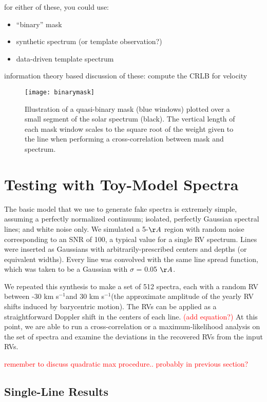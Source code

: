 \documentclass[modern]{aastex61}
\newcommand{\kms}{km s$^{-1}$}
\newcommand\todo[1]{\textcolor{red}{#1}}  %
\begin{document}
for either of these, you could use:
\begin{itemize}
\item ``binary'' mask
\item synthetic spectrum (or template observation?)
\item data-driven template spectrum
\end{itemize}

information theory based discussion of these: compute the CRLB for velocity

\begin{figure}
\centering
\texttt{[image: binarymask]}
\caption{Illustration of a quasi-binary mask (blue windows) plotted over a small segment of the solar spectrum (black). The vertical length of each mask window scales to the square root of the weight given to the line when performing a cross-correlation between mask and spectrum.}
\label{fig:binarymask}
\end{figure}


\section{Testing with Toy-Model Spectra}

The basic model that we use to generate fake spectra is extremely simple, assuming a perfectly normalized continuum; isolated, perfectly Gaussian spectral lines; and white noise only. We simulated a 5-$\AA$ region with random noise corresponding to an SNR of 100, a typical value for a single RV spectrum. Lines were inserted as Gaussians with arbitrarily-prescribed centers and depths (or equivalent widths). Every line was convolved with the same line spread function, which was taken to be a Gaussian with $\sigma$ = 0.05 $\AA$. %

We repeated this synthesis to make a set of 512 spectra, each with a random RV between -30 \kms and 30 \kms (the approximate amplitude of the yearly RV shifts induced by barycentric motion). The RVs can be applied as a straightforward Doppler shift in the centers of each line. \todo{(add equation?)} At this point, we are able to run a cross-correlation or a maximum-likelihood analysis on the set of spectra and examine the deviations in the recovered RVs from the input RVs.

\todo{remember to discuss quadratic max procedure.. probably in previous section?}

\subsection{Single-Line Results}
\end{document}
